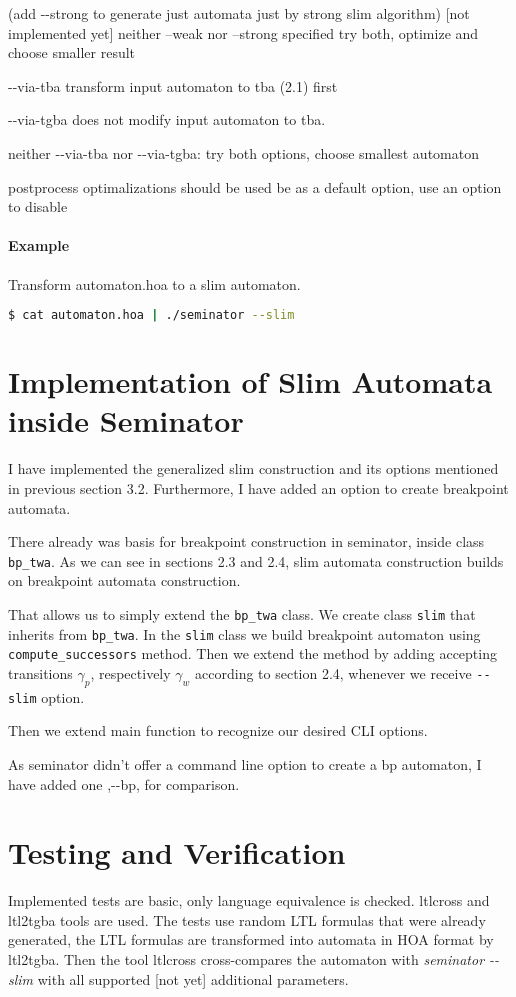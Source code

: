 \documentclass[
	digital
nolof, nolot
]{fithesis3}
\begin{document}
		(add -{}-strong to generate just automata just by strong slim algorithm)
		[not implemented yet] neither --weak nor --strong specified try both, optimize and choose smaller result
		
		-{}-via-tba transform input automaton to tba (2.1) first
		
		-{}-via-tgba does not modify input automaton to tba.
		
		neither -{}-via-tba nor -{}-via-tgba: try both options, choose smallest automaton
		
		postprocess optimalizations  should be used be as a default option, use an option to disable
		
		\paragraph{Example}
		Transform automaton.hoa to a slim automaton.
		\begin{lstlisting}[language=bash]
$ cat automaton.hoa | ./seminator --slim
		\end{lstlisting}
	\section{Implementation of Slim Automata inside Seminator}
	I have implemented the generalized slim construction and its options mentioned in previous section 3.2. Furthermore, I have added an option to create breakpoint automata.
	
	There already was basis for breakpoint construction in seminator, inside class \texttt{bp\_twa}.
	As we can see in sections 2.3 and 2.4, slim automata construction builds on breakpoint automata construction.
	
	That allows us to simply extend the \texttt{bp\_twa} class.
	We create class \texttt{slim} that inherits from \texttt{bp\_twa}.
	In the \texttt{slim} class we build breakpoint automaton using \texttt{compute\_successors} method.
	Then we extend the method by adding accepting transitions $\gamma_p$, respectively $\gamma_w$ according to section 2.4, whenever we receive \texttt{-{}-slim} option.
	
	Then we extend main function to recognize our desired CLI options.
	
	As seminator didn't offer a command line option to create a bp automaton, I have added one ,-{}-bp, for comparison.
	
	
	
	\section{Testing and Verification}
	Implemented tests are basic, only language equivalence is checked.
	ltlcross and ltl2tgba tools are used. The tests use random LTL formulas that were already generated, the LTL formulas are transformed into automata in HOA format by ltl2tgba.
	Then the tool ltlcross cross-compares the automaton with \emph{seminator -{}-slim} with all supported [not yet] additional parameters.
	
\end{document}
